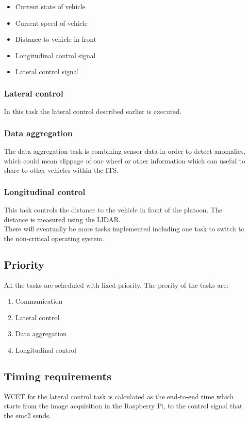 \begin{itemize}
  \item Current state of vehicle
  \item Current speed of vehicle
  \item Distance to vehicle in front
  \item Longitudinal control signal
  \item Lateral control signal
\end{itemize}

\subsubsection{Lateral control}
In this task the lateral control described earlier is executed.
\subsubsection{Data aggregation}
The data aggregation task is combining sensor data in order to detect anomalies, which could mean slippage of one wheel or other information which can useful to share to other vehicles within the ITS.  
\subsubsection{Longitudinal control}
This task controls the distance to the vehicle in front of the platoon. The distance is measured using the LIDAR.\\
 
There will eventually be more tasks implemented including one task to switch to the non-critical operating system.

\subsection{Priority}
All the tasks are scheduled with fixed priority. The prority of the tasks are:

\begin{enumerate}
  \item Communication
  \item Lateral control
  \item Data aggregation
  \item Longitudinal control
\end{enumerate}


\subsection{Timing requirements}
WCET for the lateral control task is calculated as the end-to-end time which starts from the image acquisition in the Raspberry Pi, to the control signal that the emc2 sends. 